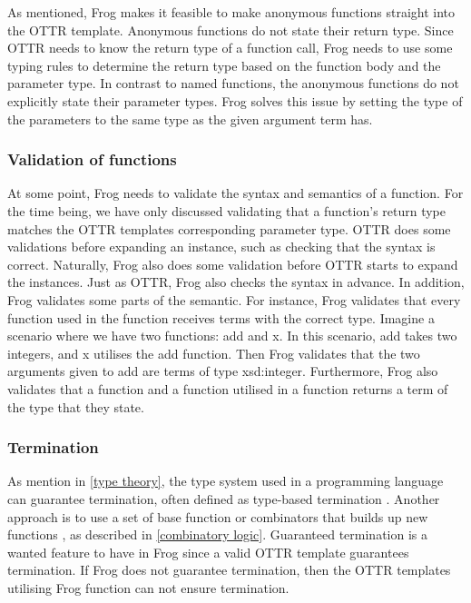 \para 
As mentioned, Frog makes it feasible to make anonymous functions straight into the OTTR template. Anonymous functions do not state their return type. Since OTTR needs to know the return type of a function call, Frog needs to use some typing rules to determine the return type based on the function body and the parameter type. In contrast to named functions, the anonymous functions do not explicitly state their parameter types. Frog solves this issue by setting the type of the parameters to the same type as the given argument term has.

\subsubsection{Validation of functions}
At some point, Frog needs to validate the syntax and semantics of a function. For the time being, we have only discussed validating that a function's return type matches the OTTR templates corresponding parameter type. OTTR does some validations before expanding an instance, such as checking that the syntax is correct. Naturally, Frog also does some validation before OTTR starts to expand the instances. Just as OTTR, Frog also checks the syntax in advance. In addition, Frog validates some parts of the semantic. For instance, Frog validates that every function used in the function receives terms with the correct type. Imagine a scenario where we have two functions: add and x. In this scenario, add takes two integers, and x utilises the add function. Then Frog validates that the two arguments given to add are terms of type xsd:integer. Furthermore, Frog also validates that a function and a function utilised in a function returns a term of the type that they state.

\subsubsection{Termination}
As mention in \autoref{type theory}, the type system used in a programming language can guarantee termination, often defined as type-based termination \autocite{TypeTermination}. Another approach is to use a set of base function or combinators that builds up new functions \autocite{TypeTermination}, as described in \autoref{combinatory logic}. Guaranteed termination is a wanted feature to have in Frog since a valid OTTR template guarantees termination. If Frog does not guarantee termination, then the OTTR templates utilising Frog function can not ensure termination. 



